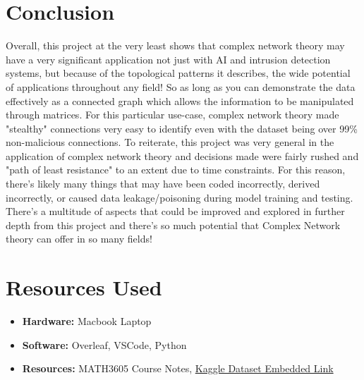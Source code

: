 \documentclass[11pt, twocolumn]{article}
\begin{document}
\section{Conclusion}
Overall, this project at the very least shows that complex network theory may have a very significant application not just with AI and intrusion detection systems, but because of the topological patterns it describes, the wide potential of applications throughout any field!  So as long as you can demonstrate the data effectively as a connected graph which allows the information to be manipulated through matrices.  For this particular use-case, complex network theory made "stealthy" connections very easy to identify even with the dataset being over 99\% non-malicious connections.  To reiterate, this project was very general in the application of complex network theory and decisions made were fairly rushed and "path of least resistance" to an extent due to time constraints.  For this reason, there's likely many things that may have been coded incorrectly, derived incorrectly, or caused data leakage/poisoning during model training and testing.  There's a multitude of aspects that could be improved and explored in further depth from this project and there's so much potential that Complex Network theory can offer in so many fields!

\section{Resources Used}
\begin{itemize}
    \item \textbf{Hardware:} Macbook Laptop
    \item \textbf{Software:} Overleaf, VSCode, Python
    \item \textbf{Resources:} MATH3605 Course Notes, \href{https://www.kaggle.com/datasets/aryashah2k/nfuqnidsv2-network-intrusion-detection-dataset?resource=download}{Kaggle Dataset Embedded Link}
\end{itemize}
\end{document}
